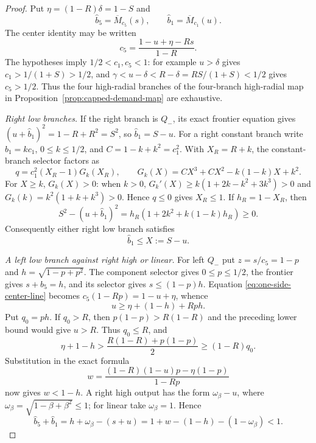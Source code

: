 \begin{proof}
Put $\eta=(1-R)\delta=1-S$ and
\[
 \widehat b_5=\overline M_{c_5}(s),\qquad
 \widehat b_1=\overline M_{c_1}(u).
\]
The center identity may be written
\begin{equation}
 c_5=\frac{1-u+\eta-Rs}{1-R}.
 \label{eq:one-side-center-line}
\end{equation}
The hypotheses imply $1/2<c_1,c_5<1$: for example
$u>\delta$ gives $c_1>1/(1+S)>1/2$, and
$\gamma<u-\delta<R-\delta=RS/(1+S)<1/2$ gives $c_5>1/2$.
Thus the four high-radial branches of
the four-branch high-radial map in Proposition~\ref{prop:capped-demand-map} are exhaustive.

\smallskip\noindent
\emph{Right low branches.}
If the right branch is $Q_-$, its exact frontier equation gives
$(u+\widehat b_1)^2=1-R+R^2=S^2$, so $\widehat b_1=S-u$.  For a right constant branch write
$\widehat b_1=kc_1$, $0\le k\le1/2$, and $C=1-k+k^2=c_1^2$.  With $X_R=R+k$, the
constant-branch selector factors as
\[
 q=c_1^2(X_R-1)G_k(X_R),\qquad
 G_k(X)=CX^3+CX^2-k(1-k)X+k^2.
\]
For $X\ge k$, $G_k(X)>0$: when $k>0$,
$G_k'(X)\ge k(1+2k-k^2+3k^3)>0$ and
$G_k(k)=k^2(1+k+k^3)>0$.  Hence $q\le0$ gives $X_R\le1$.  If
$h_R=1-X_R$, then
\[
 S^2-(u+\widehat b_1)^2=h_R(1+2k^2+k(1-k)h_R)\ge0.
\]
Consequently either right low branch satisfies
\begin{equation}
 \widehat b_1\le X:=S-u.
 \label{eq:one-side-right-low}
\end{equation}

\smallskip\noindent
\emph{A left low branch against right high or linear.}
For left $Q_-$ put $z=s/c_5=1-p$ and
$h=\sqrt{1-p+p^2}$.  The component selector gives
$0\le p\le1/2$, the frontier gives $s+\widehat b_5=h$, and its selector gives
$s\le(1-p)h$.  Equation \eqref{eq:one-side-center-line} becomes
$c_5(1-Rp)=1-u+\eta$, whence
\[
 u\ge \eta+(1-h)+Rph.
\]
Put $q_0=ph$.  If $q_0>R$, then
$p(1-p)>R(1-R)$ and the preceding lower bound would give $u>R$.
Thus $q_0\le R$, and
\[
 \eta+1-h>
 \frac{R(1-R)+p(1-p)}2\ge(1-R)q_0.
\]
Substitution in the exact formula
\[
 w=\frac{(1-R)(1-u)p-\eta(1-p)}{1-Rp}
\]
now gives $w<1-h$. A right high output has the form $\omega_\beta-u$, where
$\omega_\beta=\sqrt{1-\beta+\beta^2}\le1$; for linear take
$\omega_\beta=1$. Hence
\[
 \widehat b_5+\widehat b_1=h+\omega_\beta-(s+u)
 =1+w-(1-h)-(1-\omega_\beta)<1.
\]


\end{proof}
